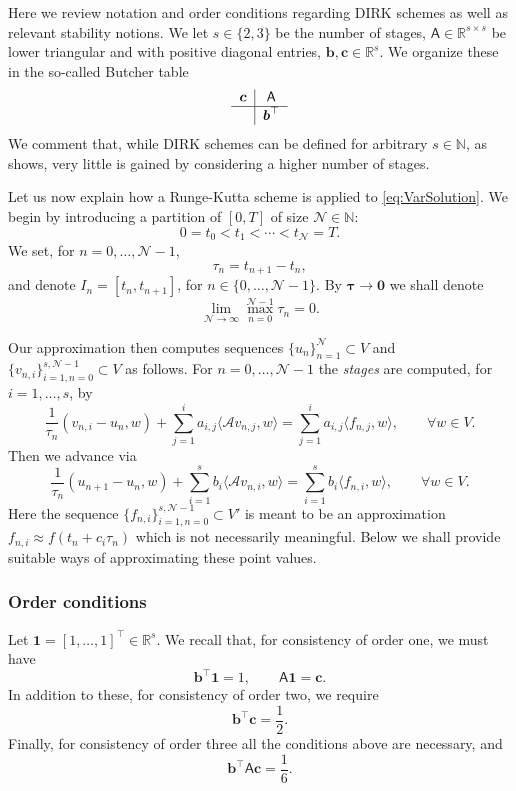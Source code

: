 \documentclass{amsart}
\newcommand{\bftau}{{\boldsymbol{\tau}}}
\newcommand{\Real}{\mathbb{R}}
\newcommand{\Natural}{\mathbb{N}}
\newcommand{\msfA}{\mathsf{A}}
\newcommand{\mclA}{\mathcal{A}}
\newcommand{\mclN}{\mathcal{N}}
\newcommand{\bfone }{\mathbf{1}}
\newcommand{\bfzero}{\mathbf{0}}
\newcommand{\bfb}{\boldsymbol{b}}
\newcommand{\bfc}{\boldsymbol{c}}
\theoremstyle{definition}
\begin{document}
Here we review notation and order conditions regarding DIRK schemes as well as relevant stability notions. We let $s \in \{2,3\}$ be the number of stages, $\msfA \in \Real^{s \times s}$ be lower triangular and with positive diagonal entries, $\bfb, \bfc \in \Real^s$. We organize these in the so-called Butcher table
\begin{equation}
\label{eq:ButcherTable}
  \begin{tabular}{c|c}
    $\bfc$ & $\msfA$\\
    \hline
     & $\bfb^\top$
  \end{tabular}
\end{equation}
We comment that, while DIRK schemes can be defined for arbitrary $s \in \mathbb{N}$, as \cite{MR458890} shows, very little is gained by considering a higher number of stages.

Let us now explain how a Runge-Kutta scheme is applied to \eqref{eq:VarSolution}. We begin by introducing a partition of $[0,T]$ of size $\mclN \in \Natural$:
\[
  0 = t_0 < t_1 < \cdots < t_\mclN = T.
\]
We set, for $n = 0, \ldots, \mclN-1$,
\[
  \tau_n = t_{n+1} - t_n,
\]
and denote $I_n = [t_n,t_{n+1}]$, for $n \in \{ 0, \ldots, \mclN-1 \}$. By $\bftau \to \bfzero$ we shall denote
\[
  \lim_{\mclN\to \infty} \max_{n=0}^{\mclN-1} \tau_n = 0.
\]

Our approximation then computes sequences $\{u_n\}_{n=1}^\mclN \subset V$ and $\{v_{n,i}\}_{i=1,n=0}^{s,\mclN-1} \subset V$ as follows. For $n = 0, \ldots, \mclN-1$ the \emph{stages} are computed, for $i=1,\ldots,s$, by
\begin{equation}
\label{eq:Stages}
  \frac1{\tau_n} \left( v_{n,i} - u_n, w \right) + \sum_{j=1}^i a_{i,j} \langle \mclA v_{n,j}, w \rangle = \sum_{j=1}^i a_{i,j}  \langle f_{n,j}, w \rangle, \qquad \forall w \in V.
\end{equation}
Then we advance via
\begin{equation}
\label{eq:Advance}
  \frac1{\tau_n} \left( u_{n+1} - u_n ,w \right) + \sum_{i=1}^s b_i \langle \mclA v_{n,i}, w \rangle = \sum_{i=1}^s b_i \langle f_{n,i}, w \rangle, \qquad \forall w \in V.
\end{equation}
Here the sequence $\{f_{n,i}\}_{i=1,n=0}^{s,\mclN-1} \subset V'$ is meant to be an approximation $f_{n,i} \approx f(t_n + c_i \tau_n)$ which is not necessarily meaningful. Below we shall provide suitable ways of approximating these point values.

\subsubsection{Order conditions}
Let $\bfone = [1, \ldots, 1]^\top \in \Real^s$. We recall that, for consistency of order one, we must have
\[
  \bfb^\top \bfone = 1, \qquad \msfA \bfone = \bfc.
\]
In addition to these, for consistency of order two, we require
\[
  \bfb^\top \bfc = \frac12.
\]
Finally, for consistency of order three all the conditions above are necessary, and
\[
  \bfb^\top \msfA \bfc = \frac16.
\]
\end{document}
